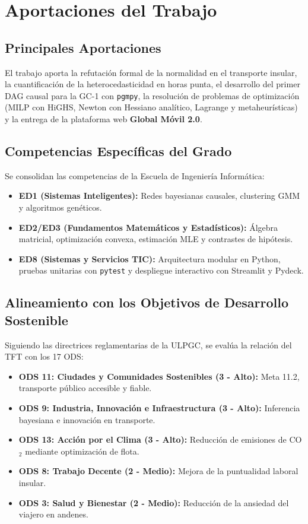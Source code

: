 \documentclass[11pt,a4paper,twoside]{report}
\begin{document}
\chapter{Aportaciones del Trabajo}

\section{Principales Aportaciones}
El trabajo aporta la refutación formal de la normalidad en el transporte insular, la cuantificación de la heterocedasticidad en horas punta, el desarrollo del primer DAG causal para la GC-1 con \texttt{pgmpy}, la resolución de problemas de optimización (MILP con HiGHS, Newton con Hessiano analítico, Lagrange y metaheurísticas) y la entrega de la plataforma web \textbf{Global Móvil 2.0}.

\section{Competencias Específicas del Grado}
Se consolidan las competencias de la Escuela de Ingeniería Informática:
\begin{itemize}
    \item \textbf{ED1 (Sistemas Inteligentes):} Redes bayesianas causales, clustering GMM y algoritmos genéticos.
    \item \textbf{ED2/ED3 (Fundamentos Matemáticos y Estadísticos):} Álgebra matricial, optimización convexa, estimación MLE y contrastes de hipótesis.
    \item \textbf{ED8 (Sistemas y Servicios TIC):} Arquitectura modular en Python, pruebas unitarias con \texttt{pytest} y despliegue interactivo con Streamlit y Pydeck.
\end{itemize}

\section{Alineamiento con los Objetivos de Desarrollo Sostenible}
Siguiendo las directrices reglamentarias de la ULPGC, se evalúa la relación del TFT con los 17 ODS:
\begin{itemize}
    \item \textbf{ODS 11: Ciudades y Comunidades Sostenibles (3 - Alto):} Meta 11.2, transporte público accesible y fiable.
    \item \textbf{ODS 9: Industria, Innovación e Infraestructura (3 - Alto):} Inferencia bayesiana e innovación en transporte.
    \item \textbf{ODS 13: Acción por el Clima (3 - Alto):} Reducción de emisiones de CO$_2$ mediante optimización de flota.
    \item \textbf{ODS 8: Trabajo Decente (2 - Medio):} Mejora de la puntualidad laboral insular.
    \item \textbf{ODS 3: Salud y Bienestar (2 - Medio):} Reducción de la ansiedad del viajero en andenes.
\end{itemize}
\end{document}
